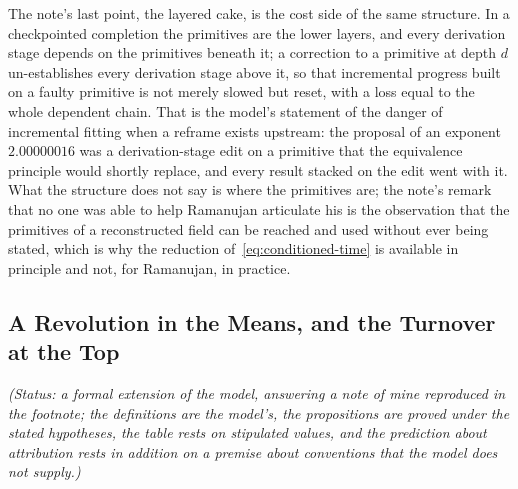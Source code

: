 \documentclass{article}
\begin{document}
The note's last point, the layered cake, is the cost side of the same structure. In a checkpointed completion the primitives are the lower layers, and every derivation stage depends on the primitives beneath it; a correction to a primitive at depth $d$ un-establishes every derivation stage above it, so that incremental progress built on a faulty primitive is not merely slowed but reset, with a loss equal to the whole dependent chain. That is the model's statement of the danger of incremental fitting when a reframe exists upstream: the proposal of an exponent $2.00000016$ \cite{hall1894mercury} was a derivation-stage edit on a primitive that the equivalence principle would shortly replace, and every result stacked on the edit went with it. What the structure does not say is where the primitives are; the note's remark that no one was able to help Ramanujan articulate his is the observation that the primitives of a reconstructed field can be reached and used without ever being stated, which is why the reduction of~\eqref{eq:conditioned-time} is available in principle and not, for Ramanujan, in practice.


\subsection{A Revolution in the Means, and the Turnover at the Top}\label{app:turnover}

\noindent\emph{(Status: a formal extension of the model, answering a note of mine reproduced in the footnote; the definitions are the model's, the propositions are proved under the stated hypotheses, the table rests on stipulated values, and the prediction about attribution rests in addition on a premise about conventions that the model does not supply.)}
\end{document}
